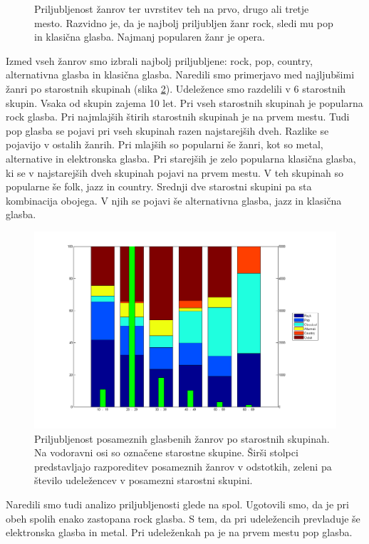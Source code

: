 \documentclass[a4paper, 12pt]{book}
\begin{document}
{\begin{figure}[hbt]
\caption{Priljubljenost žanrov ter uvrstitev teh na prvo, drugo ali tretje mesto. Razvidno je, da je najbolj priljubljen žanr rock, sledi mu pop in klasična glasba. Najmanj popularen žanr je opera.}
\label{zanrigraf}
\end{figure}

Izmed vseh žanrov smo izbrali najbolj priljubljene: rock, pop, country, alternativna glasba in klasična glasba. Naredili smo primerjavo med najljubšimi žanri po starostnih skupinah (slika \ref{zanrigraftop}). Udeležence smo razdelili v 6 starostnih skupin. Vsaka od skupin zajema 10 let. Pri vseh starostnih skupinah je popularna rock glasba. Pri najmlajših štirih starostnih skupinah je na prvem mestu. Tudi pop glasba se pojavi pri vseh skupinah razen najstarejših dveh. Razlike se pojavijo v ostalih žanrih. Pri mlajših so popularni še žanri, kot so metal, alternative in elektronska glasba. Pri starejših je zelo popularna klasična glasba, ki se v najstarejših dveh skupinah pojavi na prvem mestu. V teh skupinah so popularne še folk, jazz in country. Srednji dve starostni skupini pa sta kombinacija obojega. V njih se pojavi še alternativna glasba, jazz in klasična glasba. 

\begin{figure}[hbt]
\centering
\includegraphics[width=15cm]{images/genretop1.png}

\caption{Priljubljenost posameznih glasbenih žanrov po starostnih skupinah. Na vodoravni osi so označene starostne skupine. Širši stolpci predstavljajo razporeditev posameznih žanrov v odstotkih, zeleni pa število udeležencev v posamezni starostni skupini.  }
\label{zanrigraftop}
\end{figure}

Naredili smo tudi analizo priljubljenosti glede na spol. Ugotovili smo, da je pri obeh spolih enako zastopana rock glasba. S tem, da pri udeležencih prevladuje še elektronska glasba in metal. Pri udeleženkah pa je na prvem mestu pop glasba. 


}
\end{document}
